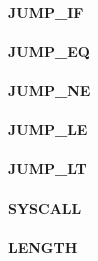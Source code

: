 \documentclass[12pt,a4paper]{article}
\begin{document}
\vspace{2em}\begin{minipage}{\textwidth}
\paragraph{JUMP\_IF}
\end{minipage}

\vspace{2em}\begin{minipage}{\textwidth}
\paragraph{JUMP\_EQ}
\end{minipage}

\vspace{2em}\begin{minipage}{\textwidth}
\paragraph{JUMP\_NE}
\end{minipage}

\vspace{2em}\begin{minipage}{\textwidth}
\paragraph{JUMP\_LE}
\end{minipage}

\vspace{2em}\begin{minipage}{\textwidth}
\paragraph{JUMP\_LT}
\end{minipage}

\vspace{2em}\begin{minipage}{\textwidth}
\paragraph{SYSCALL}
\end{minipage}

\vspace{2em}\begin{minipage}{\textwidth}
\paragraph{LENGTH}
\end{minipage}
\end{document}
